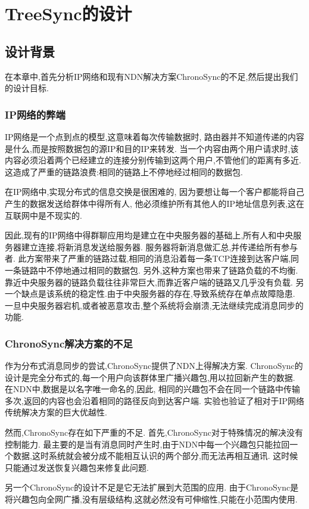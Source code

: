 \chapter{TreeSync的设计}
\label{chapter:design}

\section{设计背景}
在本章中,首先分析IP网络和现有NDN解决方案ChronoSync的不足,然后提出我们的设计目标.
\subsection{IP网络的弊端}
IP网络是一个点到点的模型,这意味着每次传输数据时,
路由器并不知道传递的内容是什么,而是按照数据包的源IP和目的IP来转发.
当一个内容由两个用户请求时,该内容必须沿着两个已经建立的连接分别传输到这两个用户,不管他们的距离有多近.
这造成了严重的链路浪费:相同的链路上不停地经过相同的数据包.

在IP网络中,实现分布式的信息交换是很困难的,
因为要想让每一个客户都能将自己产生的数据发送给群体中得所有人,
他必须维护所有其他人的IP地址信息列表,这在互联网中是不现实的.

因此,现有的IP网络中得群聊应用均是建立在中央服务器的基础上,所有人和中央服务器建立连接,将新消息发送给服务器.
服务器将新消息做汇总,并传递给所有参与者.
此方案带来了严重的链路过载,相同的消息沿着每一条TCP连接到达客户端,同一条链路中不停地通过相同的数据包.
另外,这种方案也带来了链路负载的不均衡.靠近中央服务器的链路负载往往非常巨大,而靠近客户端的链路又几乎没有负载.
另一个缺点是该系统的稳定性.由于中央服务器的存在,导致系统存在单点故障隐患.
一旦中央服务器宕机,或者被恶意攻击,整个系统将会崩溃,无法继续完成消息同步的功能.
\subsection{ChronoSync解决方案的不足}
作为分布式消息同步的尝试,ChronoSync提供了NDN上得解决方案.
ChronoSync的设计是完全分布式的,每一个用户向该群体里广播兴趣包,用以拉回新产生的数据.
在NDN中,数据是以名字唯一命名的,因此,
相同的兴趣包不会在同一个链路中传输多次,返回的内容也会沿着相同的路径反向到达客户端.
实验也验证了相对于IP网络传统解决方案的巨大优越性.

然而,ChronoSync存在如下严重的不足.
首先,ChronoSync对于特殊情况的解决没有控制能力.
最主要的是当有消息同时产生时,由于NDN中每一个兴趣包只能拉回一个数据,这时系统就会被分成不能相互认识的两个部分,而无法再相互通讯.
这时候只能通过发送恢复兴趣包来修复此问题.

另一个ChronoSync的设计不足是它无法扩展到大范围的应用.
由于ChronoSync是将兴趣包向全网广播,没有层级结构,这就必然没有可伸缩性,只能在小范围内使用.

